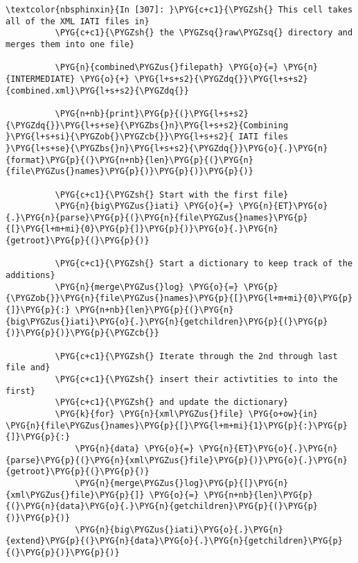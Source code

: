 \documentclass[letterpaper,10pt,english]{sphinxmanual}
\begin{document}
\begin{Verbatim}[commandchars=\\\{\}]
\textcolor{nbsphinxin}{In [307]: }\PYG{c+c1}{\PYGZsh{} This cell takes all of the XML IATI files in}
          \PYG{c+c1}{\PYGZsh{} the \PYGZsq{}raw\PYGZsq{} directory and merges them into one file}
          
          \PYG{n}{combined\PYGZus{}filepath} \PYG{o}{=} \PYG{n}{INTERMEDIATE} \PYG{o}{+} \PYG{l+s+s2}{\PYGZdq{}}\PYG{l+s+s2}{combined.xml}\PYG{l+s+s2}{\PYGZdq{}}
          
          \PYG{n+nb}{print}\PYG{p}{(}\PYG{l+s+s2}{\PYGZdq{}}\PYG{l+s+se}{\PYGZbs{}n}\PYG{l+s+s2}{Combining }\PYG{l+s+si}{\PYGZob{}\PYGZcb{}}\PYG{l+s+s2}{ IATI files }\PYG{l+s+se}{\PYGZbs{}n}\PYG{l+s+s2}{\PYGZdq{}}\PYG{o}{.}\PYG{n}{format}\PYG{p}{(}\PYG{n+nb}{len}\PYG{p}{(}\PYG{n}{file\PYGZus{}names}\PYG{p}{)}\PYG{p}{)}\PYG{p}{)}
          
          \PYG{c+c1}{\PYGZsh{} Start with the first file}
          \PYG{n}{big\PYGZus{}iati} \PYG{o}{=} \PYG{n}{ET}\PYG{o}{.}\PYG{n}{parse}\PYG{p}{(}\PYG{n}{file\PYGZus{}names}\PYG{p}{[}\PYG{l+m+mi}{0}\PYG{p}{]}\PYG{p}{)}\PYG{o}{.}\PYG{n}{getroot}\PYG{p}{(}\PYG{p}{)}
          
          \PYG{c+c1}{\PYGZsh{} Start a dictionary to keep track of the additions}
          \PYG{n}{merge\PYGZus{}log} \PYG{o}{=} \PYG{p}{\PYGZob{}}\PYG{n}{file\PYGZus{}names}\PYG{p}{[}\PYG{l+m+mi}{0}\PYG{p}{]}\PYG{p}{:} \PYG{n+nb}{len}\PYG{p}{(}\PYG{n}{big\PYGZus{}iati}\PYG{o}{.}\PYG{n}{getchildren}\PYG{p}{(}\PYG{p}{)}\PYG{p}{)}\PYG{p}{\PYGZcb{}}
          
          \PYG{c+c1}{\PYGZsh{} Iterate through the 2nd through last file and}
          \PYG{c+c1}{\PYGZsh{} insert their activtities to into the first}
          \PYG{c+c1}{\PYGZsh{} and update the dictionary}
          \PYG{k}{for} \PYG{n}{xml\PYGZus{}file} \PYG{o+ow}{in} \PYG{n}{file\PYGZus{}names}\PYG{p}{[}\PYG{l+m+mi}{1}\PYG{p}{:}\PYG{p}{]}\PYG{p}{:}
              \PYG{n}{data} \PYG{o}{=} \PYG{n}{ET}\PYG{o}{.}\PYG{n}{parse}\PYG{p}{(}\PYG{n}{xml\PYGZus{}file}\PYG{p}{)}\PYG{o}{.}\PYG{n}{getroot}\PYG{p}{(}\PYG{p}{)}
              \PYG{n}{merge\PYGZus{}log}\PYG{p}{[}\PYG{n}{xml\PYGZus{}file}\PYG{p}{]} \PYG{o}{=} \PYG{n+nb}{len}\PYG{p}{(}\PYG{n}{data}\PYG{o}{.}\PYG{n}{getchildren}\PYG{p}{(}\PYG{p}{)}\PYG{p}{)}
              \PYG{n}{big\PYGZus{}iati}\PYG{o}{.}\PYG{n}{extend}\PYG{p}{(}\PYG{n}{data}\PYG{o}{.}\PYG{n}{getchildren}\PYG{p}{(}\PYG{p}{)}\PYG{p}{)}
          

\end{Verbatim}
\end{document}
